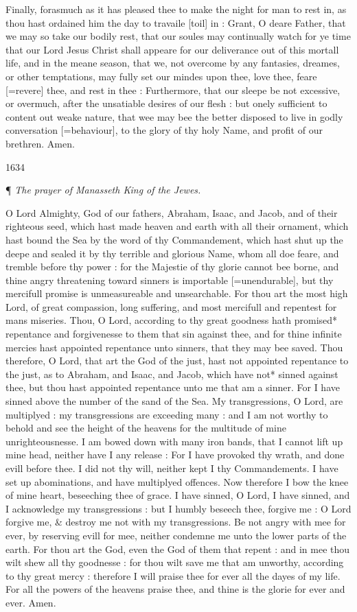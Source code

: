 Finally, forasmuch as it has pleased thee to make the
night for man to rest in, as thou hast ordained him the day to travaile
[toil]
in : Grant, O deare Father, that we may so take our bodily rest, that
our soules may continually watch for ye time that our Lord Jesus Christ
shall appeare for our deliverance out of this mortall life, and in the
meane season, that we, not overcome by any fantasies, dreames, or other
temptations, may fully set our mindes upon thee, love thee, feare [=revere]
thee, and rest in thee : Furthermore, that our sleepe be not excessive,
or overmuch, after the unsatiable desires of our flesh : but onely sufficient
to content out weake nature, that wee may bee the better disposed to live
in godly conversation [=behaviour],
to the glory of thy holy Name, and profit of our brethren. Amen. 

1634

¶
\emph{The prayer of Manasseth King of the Jewes.}

O
Lord Almighty, God of our fathers, Abraham, Isaac, and Jacob, and of their
righteous seed, which hast made heaven and earth with all their ornament,
which hast bound the Sea by the word of thy Commandement, which hast shut
up the deepe and sealed it by thy terrible and glorious Name, whom all
doe feare, and tremble before thy power : for the Majestie of thy glorie
cannot bee borne, and thine angry threatening toward sinners is importable
[=unendurable],
but thy mercifull promise is unmeasureable and unsearchable. For thou
art the most high Lord, of great compassion, long suffering, and most
mercifull and repentest for mans miseries. Thou, O Lord, according to
thy great goodness hath promised* repentance and forgivenesse to them
that sin against thee, and for thine infinite mercies hast appointed repentance
unto sinners, that they may bee saved. Thou therefore, O Lord, that art
the God of the just, hast not appointed repentance to the just, as to
Abraham, and Isaac, and Jacob, which have not* sinned against thee, but
thou hast appointed repentance unto me that am a sinner. For I have sinned
above the number of the sand of the Sea. My transgressions, O Lord, are
multiplyed : my transgressions are exceeding many : and I am not worthy
to behold and see the height of the heavens for the multitude of mine
unrighteousnesse. I am bowed down with many iron bands, that I cannot
lift up mine head, neither have I any release : For I have provoked thy
wrath, and done evill before thee. I did not thy will, neither kept I
thy Commandements. I have set up abominations, and have multiplyed offences.
Now therefore I bow the knee of mine heart, beseeching thee of grace.
I have sinned, O Lord, I have sinned, and I acknowledge my transgressions
: but I humbly beseech thee, forgive me : O Lord forgive me, \& destroy
me not with my transgressions. Be not angry with mee for ever, by reserving
evill for mee, neither condemne me unto the lower parts of the earth.
For thou art the God, even the God of them that repent : and in mee thou
wilt shew all thy goodnesse : for thou wilt save me that am unworthy,
according to thy great mercy : therefore I will praise thee for ever all
the dayes of my life. For all the powers of the heavens praise thee, and
thine is the glorie for ever and ever. Amen.

